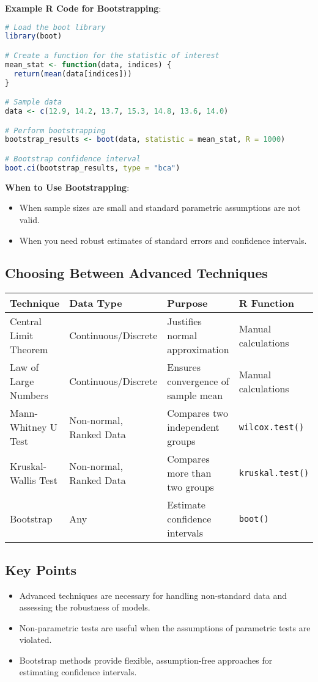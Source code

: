 \textbf{Example R Code for Bootstrapping}:

\begin{lstlisting}[language=R, caption=Bootstrap Example in R]
# Load the boot library
library(boot)

# Create a function for the statistic of interest
mean_stat <- function(data, indices) {
  return(mean(data[indices]))
}

# Sample data
data <- c(12.9, 14.2, 13.7, 15.3, 14.8, 13.6, 14.0)

# Perform bootstrapping
bootstrap_results <- boot(data, statistic = mean_stat, R = 1000)

# Bootstrap confidence interval
boot.ci(bootstrap_results, type = "bca")
\end{lstlisting}

\textbf{When to Use Bootstrapping}:
\begin{itemize}
    \item When sample sizes are small and standard parametric assumptions are not valid.
    \item When you need robust estimates of standard errors and confidence intervals.
\end{itemize}

\subsection{Choosing Between Advanced Techniques}

\begin{tabularx}{\textwidth}{|l|X|X|X|}
\hline
\textbf{Technique} & \textbf{Data Type} & \textbf{Purpose} & \textbf{R Function} \\
\hline
Central Limit Theorem & Continuous/Discrete & Justifies normal approximation & Manual calculations \\
\hline
Law of Large Numbers & Continuous/Discrete & Ensures convergence of sample mean & Manual calculations \\
\hline
Mann-Whitney U Test & Non-normal, Ranked Data & Compares two independent groups & \texttt{wilcox.test()} \\
\hline
Kruskal-Wallis Test & Non-normal, Ranked Data & Compares more than two groups & \texttt{kruskal.test()} \\
\hline
Bootstrap & Any & Estimate confidence intervals & \texttt{boot()} \\
\hline
\end{tabularx}

\subsection{Key Points}
\begin{itemize}
    \item Advanced techniques are necessary for handling non-standard data and assessing the robustness of models.
    \item Non-parametric tests are useful when the assumptions of parametric tests are violated.
    \item Bootstrap methods provide flexible, assumption-free approaches for estimating confidence intervals.
\end{itemize}
